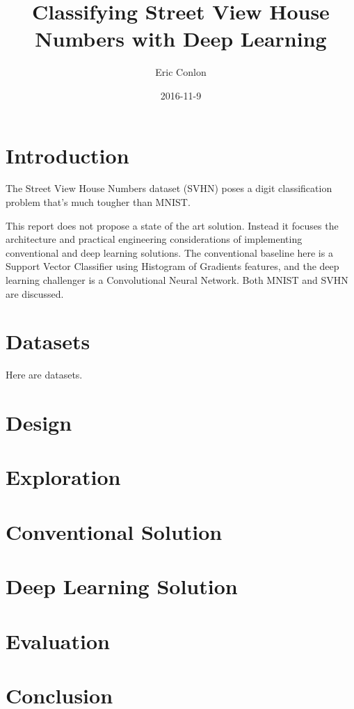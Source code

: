 \documentclass{article}
\begin{document}
\author{Eric Conlon}
\title{Classifying Street View House Numbers with Deep Learning}
\date{2016-11-9}

\maketitle{} %

\tableofcontents{} %

\section{Introduction}

The Street View House Numbers dataset (SVHN) poses a digit classification problem that's much tougher than MNIST.

This report does not propose a state of the art solution. Instead it focuses the architecture and practical engineering considerations
of implementing conventional and deep learning solutions. The conventional baseline here is a Support Vector Classifier using Histogram of Gradients features, and the deep learning challenger is a Convolutional Neural Network. Both MNIST and SVHN are discussed.

\section{Datasets}

Here are datasets.

\section{Design}

\section{Exploration}

\section{Conventional Solution}

\section{Deep Learning Solution}

\section{Evaluation}

\section{Conclusion}

\printbibliography[heading=bibintoc,title={References}]
\end{document}
